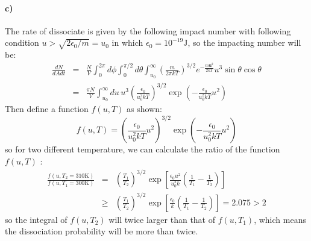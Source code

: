 \documentclass{article}
\begin{document}
\paragraph{c)}
The rate of dissociate is given by the following impact number with following condition $u> \sqrt{2\epsilon_0/m} = u_0$ in which $\epsilon_0 = 10^{-19}\mathrm{J}$, so the impacting number will be:
\begin{eqnarray}
\frac{dN}{dAdt} &=& \frac{N}{V}\int_0^{2\pi}d\phi \int_0^{\pi/2}d\theta \int_{u_0}^\infty \left(\frac{m}{2\pi kT}\right)^{3/2}e^{-\frac{m\mathbf{u}^2}{2kT}}u^3\sin{\theta} \cos{\theta}\nonumber\\
&=&\frac{\pi N}{V}\int_{u_0}^\infty du\,u^3\left(\frac{\epsilon_0}{u_0^2 kT}\right)^{3/2}\exp{\left(-\frac{\epsilon_0}{u_0^2 kT}u^2\right)}
\end{eqnarray}
Then define a function $f(u,T)$ as shown:
$$
f(u,T) = \left(\frac{\epsilon_0}{u_0^2 kT}u^2\right)^{3/2}\exp{\left(-\frac{\epsilon_0}{u_0^2 kT}u^2\right)}
$$
so for two different temperature, we can calculate the ratio of the function $f(u,T)$ :
\begin{eqnarray}
\frac{f(u,T_2 = 310\mathrm{K})}{f(u,T_1 = 300\mathrm{K})}& =& \left(\frac{T_1}{T_2}\right)^{3/2}\exp\left[\frac{\epsilon_0 u^2}{u_0^2k}\left(\frac{1}{T_1}-\frac{1}{T_2}\right)\right]\nonumber\\
&\geq&\left(\frac{T_1}{T_2}\right)^{3/2}\exp\left[\frac{\epsilon_0}{k}\left(\frac{1}{T_1}-\frac{1}{T_2}\right)\right]=2.075> 2
\end{eqnarray}
so the integral of $f(u,T_2)$ will twice larger than that of $f(u,T_1)$, which means the dissociation probability will be more than twice.
\end{document}
